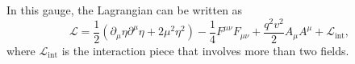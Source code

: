 \documentclass[a4paper]{article}
\begin{document}
%
%
In this gauge, the Lagrangian can be written as
\[
  \mathcal{L} = \frac{1}{2}(\partial_\mu \eta \partial^\mu \eta + 2 \mu^2 \eta^2) - \frac{1}{4} F^{\mu\nu}F_{\mu\nu} + \frac{q^2 v^2}{2} A_\mu A^\mu + \mathcal{L}_{\mathrm{int}},
\]
where $\mathcal{L}_{\mathrm{int}}$ is the interaction piece that involves more than two fields.
\end{document}
